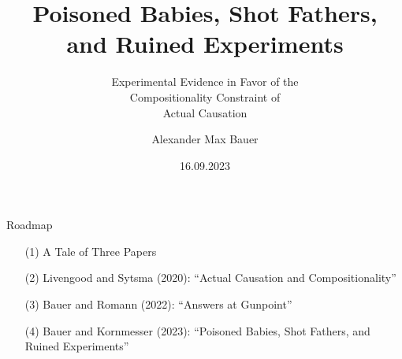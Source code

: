 \documentclass[xcolor=table,9pt,aspectratio=169]{beamer}
\title{Poisoned Babies, Shot Fathers,\\and Ruined Experiments}
\subtitle{Experimental Evidence in Favor of the\\Compositionality Constraint of\\Actual Causation}
\author{Alexander Max Bauer}
\date{16.09.2023}
\begin{document}
{
\begin{frame}
   \maketitle
\end{frame}
}


\begin{frame}{\vspace*{10mm}Roadmap}
\vspace*{-5mm}
\begin{itemize}
   \item[(1)] A Tale of Three Papers
   \item[(2)] Livengood and Sytsma (2020): ``Actual Causation and Compositionality''
   \item[(3)] Bauer and Romann (2022): ``Answers at Gunpoint''
   \item[(4)] Bauer and Kornmesser (2023): ``Poisoned Babies, Shot Fathers, and Ruined Experiments''
\end{itemize}
\end{frame}
\end{document}
